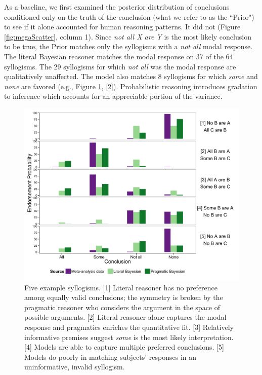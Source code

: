 \documentclass[10pt,letterpaper]{article}
\begin{document}
As a baseline, we first examined the posterior distribution of conclusions conditioned only on the truth of the conclusion (what we refer to as the ``Prior") to see if it alone accounted for human reasoning patterns. It did not (Figure \ref{fig:megaScatter}, column 1). Since \emph{not all X are Y} is the most likely conclusion to be true, the Prior matches only the syllogisms with a \emph{not all} modal response. 
%
The literal Bayesian reasoner matches the modal response on 37 of the 64 syllogisms. The 29 syllogisms for which \emph{not all} was the modal response are qualitatively unaffected. The model also matches 8 syllogisms for which \emph{some} and \emph{none} are favored (e.g., Figure \ref{fig:barplots}, [2]). Probabilistic reasoning introduces gradation to inference which accounts for an appreciable portion of the variance.
%
\begin{figure}
\centering
    \includegraphics[width=\columnwidth]{multibar_fig1}
    \caption{Five example syllogisms. 
    [1] Literal reasoner  has no preference among equally valid conclusions; the symmetry is broken by the pragmatic reasoner who considers the argument in the space of possible arguments.     
    [2] Literal reasoner alone captures the modal response and pragmatics enriches the quantitative fit.     
    [3] Relatively informative premises suggest \emph{some} is the most likely interpretation. 
    [4] Models are able to capture multiple preferred conclusions. 
    [5] Models do poorly in matching subjects' responses in an uninformative, invalid syllogism.}
  \label{fig:barplots}
\end{figure}
\end{document}
